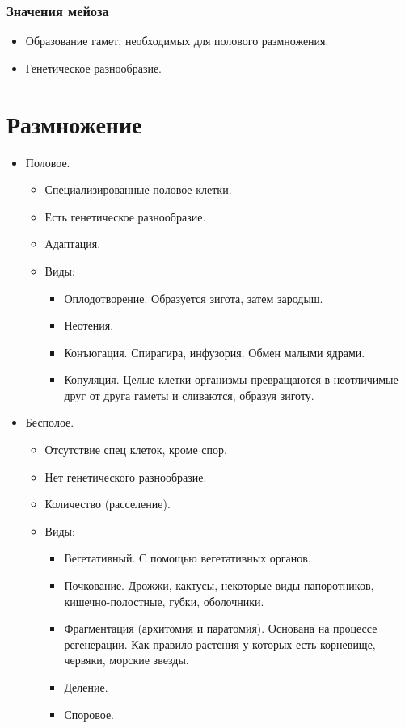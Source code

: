 \documentclass[12pt]{article}
\begin{document}
	\subsubsection{Значения мейоза}
	\begin{itemize}
		\item Образование гамет, необходимых для полового размножения.
		\item Генетическое разнообразие.
	\end{itemize}
	\section{Размножение}
	\begin{itemize}
		\item Половое.
		\begin{itemize}
			\item Специализированные половое клетки.
			\item Есть генетическое разнообразие.
			\item Адаптация.
			\item Виды:
			\begin{itemize}
				\item Оплодотворение. Образуется зигота, затем зародыш.
				\item Неотения.
				\item Конъюгация. Спирагира, инфузория. Обмен малыми ядрами.
				\item Копуляция. Целые клетки-организмы превращаются в неотличимые друг от друга гаметы и сливаются, образуя зиготу.
			\end{itemize}
		\end{itemize}
		\item Бесполое.
		\begin{itemize}
			\item Отсутствие спец клеток, кроме спор.
			\item Нет генетического разнообразие.
			\item Количество (расселение).
			\item Виды:
			\begin{itemize}
				\item Вегетативный. С помощью вегетативных органов.
				\item Почкование. Дрожжи, кактусы, некоторые виды папоротников, кишечно-полостные, губки, оболочники.
				\item Фрагментация (архитомия и паратомия). Основана на процессе регенерации. Как правило растения у которых есть корневище, червяки, морские звезды.
				\item Деление.
				\item Споровое.
			\end{itemize}
		\end{itemize}
	\end{itemize}
\end{document}
